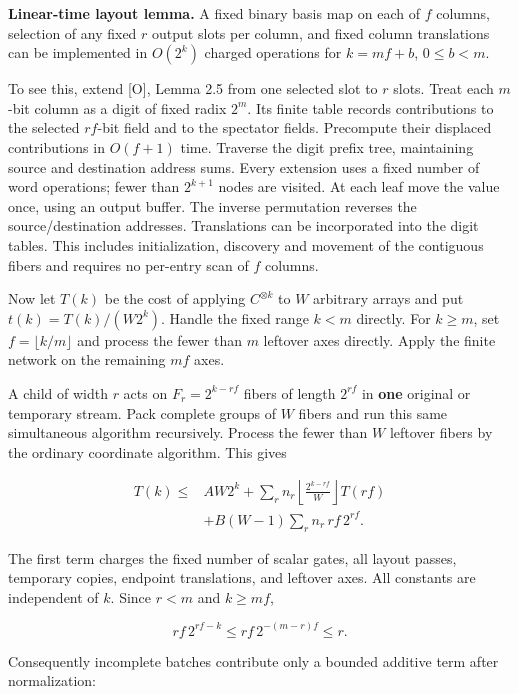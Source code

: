 \documentclass[
  11pt,
]{article}
\begin{document}
\textbf{Linear-time layout lemma.} A fixed binary basis map on each of
\(f\) columns, selection of any fixed \(r\) output slots per column, and
fixed column translations can be implemented in \(O(2^k)\) charged
operations for \(k=mf+b\), \(0\le b<m\).

To see this, extend {[}O{]}, Lemma 2.5 from one selected slot to \(r\)
slots. Treat each \(m\)-bit column as a digit of fixed radix \(2^m\).
Its finite table records contributions to the selected \(rf\)-bit field
and to the spectator fields. Precompute their displaced contributions in
\(O(f+1)\) time. Traverse the digit prefix tree, maintaining source and
destination address sums. Every extension uses a fixed number of word
operations; fewer than \(2^{k+1}\) nodes are visited. At each leaf move
the value once, using an output buffer. The inverse permutation reverses
the source/destination addresses. Translations can be incorporated into
the digit tables. This includes initialization, discovery and movement
of the contiguous fibers and requires no per-entry scan of \(f\)
columns.

Now let \(T(k)\) be the cost of applying \(C^{\otimes k}\) to \(W\)
arbitrary arrays and put \(t(k)=T(k)/(W2^k)\). Handle the fixed range
\(k<m\) directly. For \(k\ge m\), set \(f=\lfloor k/m\rfloor\) and
process the fewer than \(m\) leftover axes directly. Apply the finite
network on the remaining \(mf\) axes.

A child of width \(r\) acts on \(F_r=2^{k-rf}\) fibers of length
\(2^{rf}\) in \textbf{one} original or temporary stream. Pack complete
groups of \(W\) fibers and run this same simultaneous algorithm
recursively. Process the fewer than \(W\) leftover fibers by the
ordinary coordinate algorithm. This gives

\[
\begin{split}
 T(k)\le{}&A W2^k+\sum_r n_r\left\lfloor\frac{2^{k-rf}}W\right\rfloor T(rf)\\
 &+B(W-1)\sum_r n_r\,rf\,2^{rf}.
\end{split}
 \tag{8.1}
\]

The first term charges the fixed number of scalar gates, all layout
passes, temporary copies, endpoint translations, and leftover axes. All
constants are independent of \(k\). Since \(r<m\) and \(k\ge mf\),

\[
 rf\,2^{rf-k}\le rf\,2^{-(m-r)f}\le r.
\]

Consequently incomplete batches contribute only a bounded additive term
after normalization:
\end{document}
